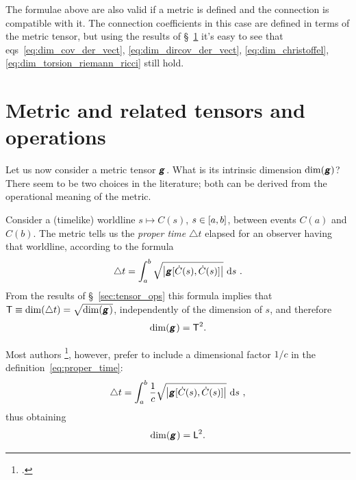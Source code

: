 \documentclass[\ifafour a4paper,12pt,\else a5paper,10pt,\fi%
onecolumn,oneside,article,%
british%
]{memoir}
\makeatletter
\theoremstyle{remark}
\theoremstyle{innote}
\newcommand*{\mathte}[1]{\textbf{\textit{\textsf{#1}}}}
\newcommand*{\citep}{\footcites}
\newcommand*{\di}{\mathrm{d}}%
\newcommand*{\incr}{\triangle}%
\DeclarePairedDelimiter\clcl{[}{]}
\DeclarePairedDelimiter\abs{\lvert}{\rvert}
\renewcommand*{\|}[1][]{\nonscript\,#1\vert\nonscript\;\mathopen{}}
\newcommand*{\sect}{\S}%
\newcommand*{\chap}{ch.}%
\newcommand*{\eqn}{eq.}%
\newcommand*{\eqns}{eqs}%
\newcommand*{\eg}{{e.g.}}
\newcommand*{\q}{}%
\DeclareRobustCommand*{\q}{%
  \mathbin{\mathpalette\bigcdot@{}}%
}
\newcommand*{\bigcdot@scalefactor}{0.7}
\newcommand*{\bigcdot@widthfactor}{1.5}
\newcommand*{\bigcdot@}[2]{%
  \sbox0{$#1\vcenter{}$}%
  \sbox2{$#1\cdot\m@th$}%
  \hbox to \bigcdot@widthfactor\wd2{%
    \hfil
    \raise\ht0\hbox{%
      \scalebox{\bigcdot@scalefactor}{%
        \lower\ht0\hbox{$#1\bullet\m@th$}%
      }%
    }%
    \hfil
  }%
}
\newcommand*{\Le}{\textsf{L}}
\newcommand*{\Ti}{\textsf{T}}
\newcommand*{\yg}{\mathte{g}}
\newcommand*{\ygc}{\mathte{g}}
\renewcommand*{\i}{\indices}
\newcommand*{\inct}{\incr t}
\makeatother
\begin{document}
\medskip

The formulae above are also valid if a metric is defined and the connection
is compatible with it. The connection coefficients in this case are defined
in terms of the metric tensor, but using the results of
\sect~\ref{sec:metric} it's easy to see that
\eqns~\eqref{eq:dim_cov_der_vect}, \eqref{eq:dim_dircov_der_vect},
\eqref{eq:dim_christoffel}, \eqref{eq:dim_torsion_riemann_ricci} still
hold.


\section{Metric and related tensors and operations}
\label{sec:metric}

Let us now consider a metric tensor $\yg\i{_{\q\q}}$. What is its intrinsic
dimension $\dim(\yg)$? There seem to be two choices in the literature; both
can be derived from the operational meaning of the metric.


Consider a (timelike) worldline $s \mapsto C(s)$, $s\in \clcl{a,b}$,
between events $C(a)$ and $C(b)$. The metric tells us the \emph{proper
  time} $\inct$ elapsed for an observer having that worldline, according to
the formula
\begin{equation}%
  \label{eq:proper_time}
\inct =  \int_a^b
\sqrt{\abs*{\yg[\dot{C}(s),\dot{C}(s)]}} \  \di s\ .
\end{equation}
From the results of \sect~\ref{sec:tensor_ops} this formula implies that
 $\Ti \equiv \dim(\inct) = \sqrt{\dim(\yg\i{_{\q\q}})}$,
independently of the dimension of $s$, and therefore
\begin{equation}%
  \label{eq:dim_g}
  \dim(\yg\i{_{\q\q}}) = \Ti^{2}.
\end{equation}

Most authors \citep[\eg][\sect~V.62 \eqn~(62.02)]{fock1955_t1964}[\chap~11
\eqn~(11.21)]{curtisetal1985}[\sect~5.3
\eqn~(5.6)]{rindler1969_r1986}[\chap~6 \eqn~(6.24)]{hartle2003}, however,
prefer to include a dimensional factor $1/c$ in the
definition~\eqref{eq:proper_time}:
\begin{equation}%
  \label{eq:proper_time_c}
  \inct = \int_a^b
  \frac{1}{c} \sqrt{\abs*{\ygc[\dot{C}(s),\dot{C}(s)]}} \ \di s\ ,
\end{equation}
thus obtaining
\begin{equation}%
  \label{eq:dim_g_c}
  \dim(\ygc\i{_{\q\q}}) = \Le^{2}.
\end{equation}
\end{document}
